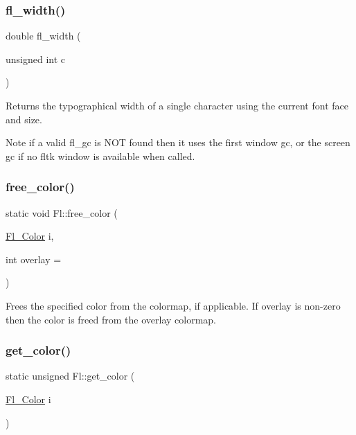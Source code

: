 \subsubsection{\texorpdfstring{fl\+\_\+width()}{fl\_width()}\hspace{0.1cm}{\footnotesize\ttfamily [3/3]}}
{\footnotesize\ttfamily double fl\+\_\+width (\begin{DoxyParamCaption}\item[{unsigned int}]{c }\end{DoxyParamCaption})\hspace{0.3cm}{\ttfamily [inline]}}

Returns the typographical width of a single character using the current font face and size. \begin{DoxyNote}{Note}
if a valid fl\+\_\+gc is N\+OT found then it uses the first window gc, or the screen gc if no fltk window is available when called. 
\end{DoxyNote}
\mbox{\label{group__fl__attributes_ga33e301d16b1679406c52a092785639f4}} 
\subsubsection{\texorpdfstring{free\+\_\+color()}{free\_color()}}
{\footnotesize\ttfamily static void Fl\+::free\+\_\+color (\begin{DoxyParamCaption}\item[{\hyperlink{_enumerations_8_h_a8b762953646f8abee866061f1af78a6a}{Fl\+\_\+\+Color}}]{i,  }\item[{int}]{overlay = {} }\end{DoxyParamCaption})\hspace{0.3cm}{\ttfamily [static]}}

Frees the specified color from the colormap, if applicable. If overlay is non-\/zero then the color is freed from the overlay colormap. \mbox{\label{group__fl__attributes_gaafd4aeaec9c7fadd27b7771f087355d3}} 
\subsubsection{\texorpdfstring{get\+\_\+color()}{get\_color()}\hspace{0.1cm}{\footnotesize\ttfamily [1/2]}}
{\footnotesize\ttfamily static unsigned Fl\+::get\+\_\+color (\begin{DoxyParamCaption}\item[{\hyperlink{_enumerations_8_h_a8b762953646f8abee866061f1af78a6a}{Fl\+\_\+\+Color}}]{i }\end{DoxyParamCaption})\hspace{0.3cm}{\ttfamily [static]}}

